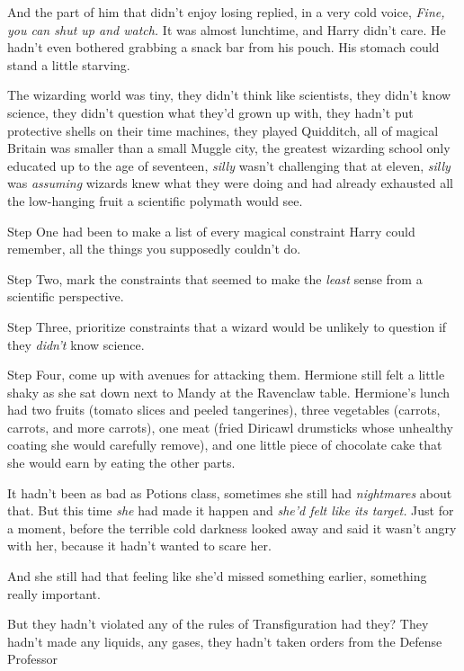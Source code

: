 And the part of him that didn't enjoy losing replied, in a very cold voice,
\emph{Fine, you can shut up and watch.}
\sbreak
It was almost lunchtime, and Harry didn't care. He hadn't even bothered
grabbing a snack bar from his pouch. His stomach could stand a little starving.

The wizarding world was tiny, they didn't think like scientists, they didn't
know science, they didn't question what they'd grown up with, they hadn't put
protective shells on their time machines, they played Quidditch, all of magical
Britain was smaller than a small Muggle city, the greatest wizarding school
only educated up to the age of seventeen, \emph{silly} wasn't challenging that
at eleven, \emph{silly} was \emph{assuming} wizards knew what they were doing
and had already exhausted all the low-hanging fruit a scientific polymath would
see.

Step One had been to make a list of every magical constraint Harry could
remember, all the things you supposedly couldn't do.

Step Two, mark the constraints that seemed to make the \emph{least} sense from
a scientific perspective.

Step Three, prioritize constraints that a wizard would be unlikely to question
if they \emph{didn't} know science.

Step Four, come up with avenues for attacking them.
\sbreak
Hermione still felt a little shaky as she sat down next to Mandy at the
Ravenclaw table. Hermione's lunch had two fruits (tomato slices and peeled
tangerines), three vegetables (carrots, carrots, and more carrots), one meat
(fried Diricawl drumsticks whose unhealthy coating she would carefully remove),
and one little piece of chocolate cake that she would earn by eating the other
parts.

It hadn't been as bad as Potions class, sometimes she still had
\emph{nightmares} about that. But this time \emph{she} had made it happen and
\emph{she'd felt like its target.} Just for a moment, before the terrible cold
darkness looked away and said it wasn't angry with her, because it hadn't
wanted to scare her.

And she still had that feeling like she'd missed something earlier, something
really important.

But they hadn't violated any of the rules of Transfiguration{\el} had they?
They hadn't made any liquids, any gases, they hadn't taken orders from the
Defense Professor{\el}

